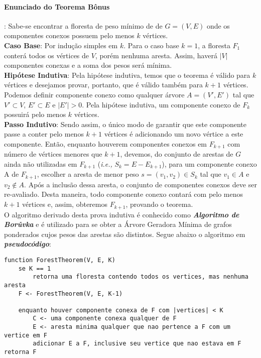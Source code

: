 \documentclass[paper=a4, fontsize=11pt]{scrartcl} %
\numberwithin{equation}{section} %
\numberwithin{figure}{section} %
\numberwithin{table}{section} %
\begin{document}
\paragraph{Enunciado do Teorema Bônus}: Sabe-se encontrar a floresta de peso mínimo de de $G=(V,E)$ onde os componentes conexos possuem pelo menos $k$ vértices. \\

\textbf{Caso Base}: Por indução simples em $k$. Para o caso base $k = 1$, a floresta $F_1$ conterá todos os vértices de $V$, porém nenhuma aresta. Assim, haverá $|V|$ componentes conexas e a soma dos pesos será mínima. \\

\textbf{Hipótese Indutiva}: Pela hipótese indutiva, temos que o teorema é válido para $k$ vértices e desejamos provar, portanto, que é válido também para $k+1$ vértices. Podemos definir componente conexo como qualquer árvore $A=(V',E')$ tal que $V'\subset V$, $E'\subset E$ e $|E'|>0$. Pela hipótese indutiva, um componente conexo de $F_k$ possuirá pelo menos $k$ vértices. \\

\textbf{Passo Indutivo}: Sendo assim, o único modo de garantir que este componente passe a conter pelo menos $k+1$ vértices é adicionando um novo vértice a este componente. Então, enquanto houverem componentes conexos em $F_{k+1}$ com número de vértices menores que $k+1$, devemos, do conjunto de arestas de $G$ ainda não utilizadas em $F_{k+1}$ (\textit{i.e.,} $S_k=E-E_{k+1}$), para um componente conexo A de $F_{k+1}$, escolher a aresta de menor peso $s=(v_1,v_2)\in S_k$ tal que $v_1 \in A$ e $v_2 \notin A$. Após a inclusão dessa aresta, o conjunto de componentes conexos deve ser re-avaliado. Desta maneira, todo componente conexo contará com pelo menos $k+1$ vértices e, assim, obteremos $F_{k+1}$, provando o teorema. \\

O algoritmo derivado desta prova indutiva é conhecido como \emph{\textbf{Algoritmo de Borůvka}} e é utilizado para se obter a Árvore Geradora Mínima de grafos ponderados cujos pesos das arestas são distintos. Segue abaixo o algoritmo em \emph{\textbf{pseudocódigo}}:

{\color{blue}
\begin{verbatim}
function ForestTheorem(V, E, K)
    se K == 1
        retorna uma floresta contendo todos os vertices, mas nenhuma aresta
    F <- ForestTheorem(V, E, K-1)

    enquanto houver componente conexa de F com |vertices| < K
        C <- uma componente conexa qualquer de F
        E <- aresta minima qualquer que nao pertence a F com um vertice em F
        adicionar E a F, inclusive seu vertice que nao estava em F
retorna F
\end{verbatim}
}
\end{document}
